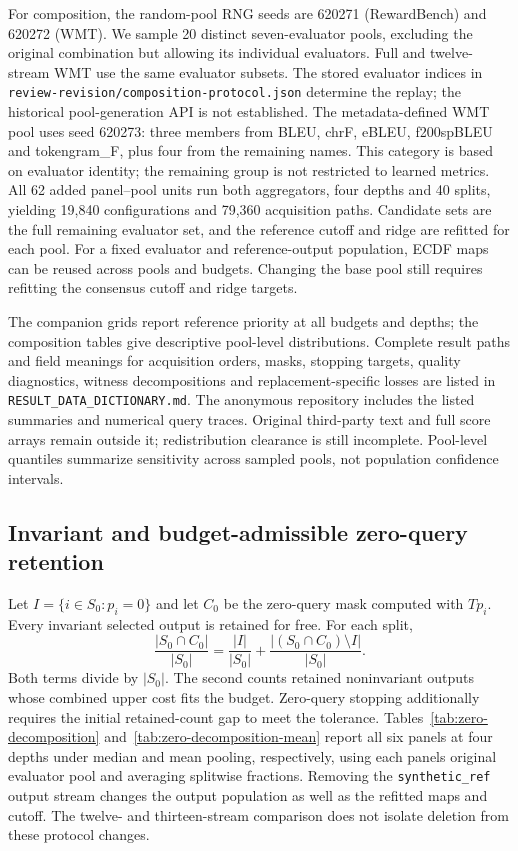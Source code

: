 For composition, the random-pool RNG seeds are 620271 (RewardBench) and 620272 (WMT). We sample 20 distinct seven-evaluator pools, excluding the original combination but allowing its individual evaluators. Full and twelve-stream WMT use the same evaluator subsets. The stored evaluator indices in \nolinkurl{review-revision/composition-protocol.json} determine the replay; the historical pool-generation API is not established. The metadata-defined WMT pool uses seed 620273: three members from BLEU, chrF, eBLEU, f200spBLEU and tokengram\_F, plus four from the remaining names. This category is based on evaluator identity; the remaining group is not restricted to learned metrics. All 62 added panel--pool units run both aggregators, four depths and 40 splits, yielding 19,840 configurations and 79,360 acquisition paths. Candidate sets are the full remaining evaluator set, and the reference cutoff and ridge are refitted for each pool. For a fixed evaluator and reference-output population, ECDF maps can be reused across pools and budgets. Changing the base pool still requires refitting the consensus cutoff and ridge targets.

The companion grids report reference priority at all budgets and depths; the composition tables give descriptive pool-level distributions. Complete result paths and field meanings for acquisition orders, masks, stopping targets, quality diagnostics, witness decompositions and replacement-specific losses are listed in \nolinkurl{RESULT_DATA_DICTIONARY.md}. The anonymous repository includes the listed summaries and numerical query traces. Original third-party text and full score arrays remain outside it; redistribution clearance is still incomplete. Pool-level quantiles summarize sensitivity across sampled pools, not population confidence intervals.
\subsection{Invariant and budget-admissible zero-query retention}
\label{app:zero-decomposition}
Let $I=\{i\in S_0:p_i=0\}$ and let $C_0$ be the zero-query mask computed with $Tp_i$. Every invariant selected output is retained for free. For each split,
\[
 \frac{|S_0\cap C_0|}{|S_0|}
 =\frac{|I|}{|S_0|}+\frac{|(S_0\cap C_0)\setminus I|}{|S_0|}.
\]
Both terms divide by $|S_0|$. The second counts retained noninvariant outputs whose combined upper cost fits the budget. Zero-query stopping additionally requires the initial retained-count gap to meet the tolerance. Tables~\ref{tab:zero-decomposition} and~\ref{tab:zero-decomposition-mean} report all six panels at four depths under median and mean pooling, respectively, using each panel\textquotesingle s original evaluator pool and averaging splitwise fractions. Removing the \texttt{synthetic\_ref} output stream changes the output population as well as the refitted maps and cutoff. The twelve- and thirteen-stream comparison does not isolate deletion from these protocol changes.


